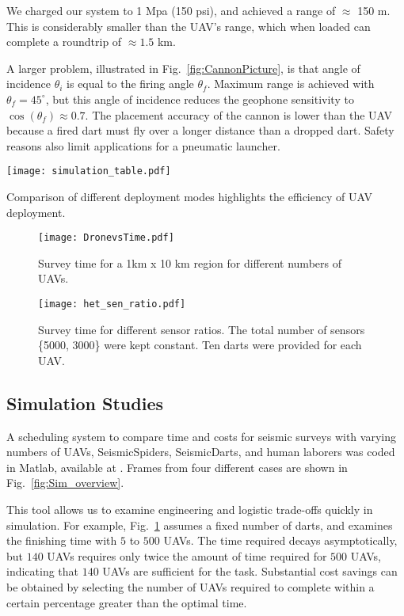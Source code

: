 We charged our system to 1 Mpa (150 psi), and achieved a range of $\approx$ 150 m.
This is considerably smaller than the UAV's range, which when loaded can complete a roundtrip of $\approx 1.5$ km.

A larger problem, illustrated in Fig.~\ref{fig:CannonPicture}, is that angle of incidence $\theta_i$ is equal to the firing angle $\theta_f$. 
Maximum range is achieved with $\theta_f = 45^\circ$, but this angle of incidence reduces the geophone sensitivity to $\cos(\theta_f )\approx 0.7$.
The placement accuracy of the cannon is lower than the UAV because a fired dart must fly over a longer distance than a dropped dart. 
Safety reasons also limit applications for a pneumatic launcher.





\begin{table} \centering
  {\texttt{[image: simulation\_table.pdf]}}
 \caption{Comparison of different  deployment modes highlights the efficiency of UAV deployment.} 
 \label{tab:Sim_table}
\end{table}

\begin{figure} \centering
  {\texttt{[image: DronevsTime.pdf]}}
 \caption{Survey time for a 1km x 10 km region for different numbers of UAVs.} 
 \label{fig:DronevsTime}
\end{figure}

\begin{figure} \centering
  {\texttt{[image: het\_sen\_ratio.pdf]}}
 \caption{Survey time for different sensor ratios. The total number of sensors \{5000, 3000\} were kept constant. Ten darts were provided for each UAV. } 
 \label{fig:het_sen_ratio}
\end{figure}

\subsection{Simulation Studies}


A scheduling system to compare  time and costs for seismic surveys with varying numbers of UAVs, SeismicSpiders, SeismicDarts, and human laborers was coded in  {\sc Matlab}, available at \cite{Srikanth2016seismicScheduler}. Frames from four different cases are shown in Fig.~\ref{fig:Sim_overview}.

This tool allows us to examine engineering and logistic trade-offs quickly in simulation.  For example, Fig.~\ref{fig:DronevsTime} assumes a fixed number of darts, and examines the finishing time with $5$ to $500$ UAVs.  The time required decays asymptotically, but $140$ UAVs requires only twice the amount of time required for $500$ UAVs, indicating that $140$ UAVs are sufficient for the task.    
 Substantial cost savings can be obtained by selecting the number of UAVs required to complete within a certain percentage greater than the optimal time.

